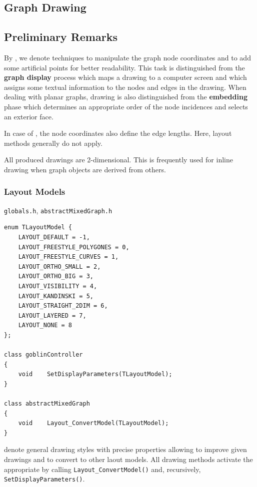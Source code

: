\documentclass[a4paper,11pt,twoside]{book}
\begin{document}
\begin{multicols}{2}
\chapter{Graph Drawing}
\thispagestyle{fancy}
\label{clb_graph_drawing}

\section{Preliminary Remarks}
By , we denote techniques to manipulate the graph node
coordinates and to add some artificial points for better readability. This
task is distinguished from the {\bf graph display} process which maps a drawing
to a computer screen and which assigns some textual information to the
nodes and edges in the drawing. When dealing with planar graphs, drawing is
also distinguished from the {\bf embedding} phase which determines an
appropriate order of the node incidences and selects an exterior face.

In case of , the node coordinates also
define the edge lengths. Here, layout methods generally do not apply.

All produced drawings are 2-dimensional. This is frequently used for inline
drawing when graph objects are derived from others.


\subsection{Layout Models}
\label{slb_layout_models}
\myinclude\verb/globals.h/, \verb/abstractMixedGraph.h/
\begin{mymethods}
\begin{verbatim}
enum TLayoutModel {
    LAYOUT_DEFAULT = -1,
    LAYOUT_FREESTYLE_POLYGONES = 0,
    LAYOUT_FREESTYLE_CURVES = 1,
    LAYOUT_ORTHO_SMALL = 2,
    LAYOUT_ORTHO_BIG = 3,
    LAYOUT_VISIBILITY = 4,
    LAYOUT_KANDINSKI = 5,
    LAYOUT_STRAIGHT_2DIM = 6,
    LAYOUT_LAYERED = 7,
    LAYOUT_NONE = 8
};

class goblinController
{
    void    SetDisplayParameters(TLayoutModel);
}

class abstractMixedGraph
{
    void    Layout_ConvertModel(TLayoutModel);
}
\end{verbatim}
\end{mymethods}
 denote general drawing styles with precise properties
allowing to improve given drawings and to convert to other laout models.
All drawing methods activate the appropriate  by calling
\verb/Layout_ConvertModel()/ and, recursively, \verb/SetDisplayParameters()/.


\end{multicols}
\end{document}
